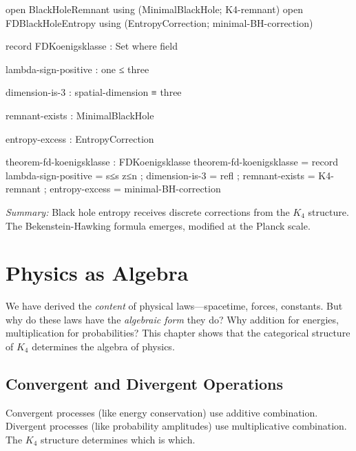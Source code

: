 \documentclass[11pt,a4paper]{book}
\begin{document}
\begin{code}
open BlackHoleRemnant using (MinimalBlackHole; K4-remnant)
open FDBlackHoleEntropy using (EntropyCorrection; minimal-BH-correction)

record FDKoenigsklasse : Set where
  field
    
    lambda-sign-positive : one ≤ three
    
    dimension-is-3 : spatial-dimension ≡ three
    
    remnant-exists : MinimalBlackHole
    
    entropy-excess : EntropyCorrection
    
theorem-fd-koenigsklasse : FDKoenigsklasse
theorem-fd-koenigsklasse = record
  { lambda-sign-positive = s≤s z≤n
  ; dimension-is-3 = refl
  ; remnant-exists = K4-remnant
  ; entropy-excess = minimal-BH-correction
  }
\end{code}

\medskip
\noindent\textit{Summary:} Black hole entropy receives discrete corrections from the $K_4$ 
structure. The Bekenstein-Hawking formula emerges, modified at the Planck scale.

\chapter{Physics as Algebra}
\label{chap:algebraic-structure-physics}

We have derived the \emph{content} of physical laws—spacetime, forces, constants. But why 
do these laws have the \emph{algebraic form} they do? Why addition for energies, 
multiplication for probabilities? This chapter shows that the categorical structure of 
$K_4$ determines the algebra of physics.

\section{Convergent and Divergent Operations}
\label{sec:algebraic-ops}

Convergent processes (like energy conservation) use additive combination.
Divergent processes (like probability amplitudes) use multiplicative combination.
The $K_4$ structure determines which is which.
\end{document}
